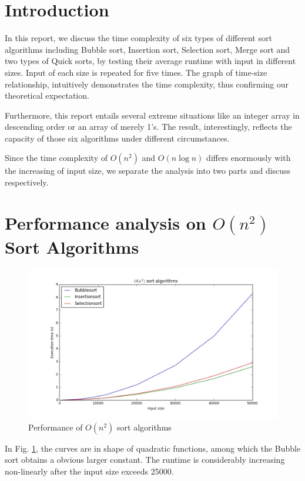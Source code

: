 
\section{Introduction}
In this report, we discuss the time complexity of six types of different sort algorithms including Bubble sort, Insertion sort, Selection sort, Merge sort and two types of Quick sorts, by testing their average runtime with input in different sizes. Input of each size is repeated for five times. The graph of time-size relationship, intuitively demonstrates the time complexity, thus confirming our theoretical expectation.

Furthermore, this report entails several extreme situations like an integer array in descending order or an array of merely 1's. The result, interestingly, reflects the capacity of those six algorithms under different circumstances.

Since the time complexity of $O(n^2)$ and $O(n\log n)$ differs enormously with the increasing of input size, we separate the analysis into two parts and discuss respectively.

\section{Performance analysis on $O(n^2)$ Sort Algorithms}
\begin{figure}[H]
    \centering
    \includegraphics[width=0.75\linewidth]{../a1/012}
    \caption{Performance of $O(n^2)$ sort algorithms}\label{012}
\end{figure}
In Fig. \ref{012}, the curves are in shape of quadratic functions, among which the Bubble sort obtains a obvious larger constant. The runtime is considerably increasing non-linearly after the input size exceeds 25000.


